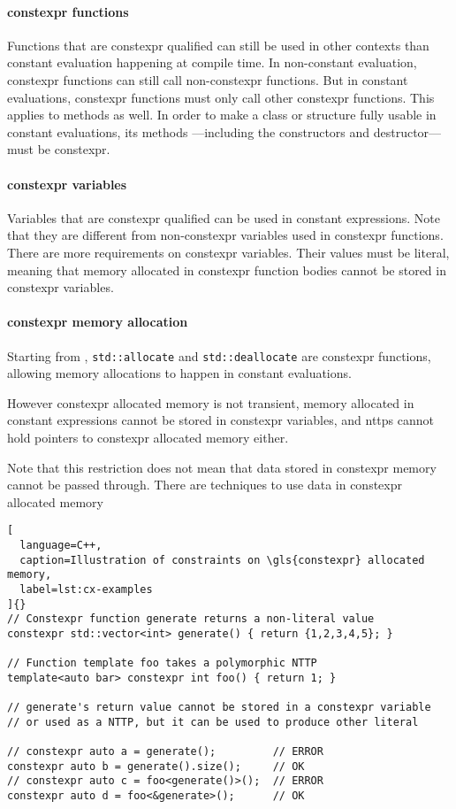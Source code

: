 \documentclass[../main]{subfiles}
\begin{document}
\paragraph{\gls{constexpr} functions} Functions that are \gls{constexpr} qualified can
still be used in other contexts than constant evaluation happening at
compile time. In non-constant evaluation, \gls{constexpr} functions can still call
non-\gls{constexpr} functions. But in constant evaluations, \gls{constexpr} functions must
only call other \gls{constexpr} functions. This applies to methods as well.
In order to make a \cpp class or structure fully usable in constant evaluations,
its methods ---including the constructors and destructor--- must be \gls{constexpr}.

\paragraph{\gls{constexpr} variables} Variables that are \gls{constexpr} qualified can be
used in constant expressions. Note that they are different from
non-\gls{constexpr} variables used in \gls{constexpr} functions.
There are more requirements on \gls{constexpr} variables.
Their values must be literal, meaning that memory allocated in \gls{constexpr}
function bodies cannot be stored in \gls{constexpr} variables.

\paragraph{
  \gls{constexpr} memory allocation
}
Starting from , \lstinline{std::allocate} and \lstinline{std::deallocate}
are \gls{constexpr} functions, allowing memory allocations to happen in
constant evaluations.

However \gls{constexpr} allocated memory is not transient, \ie memory allocated in
constant expressions cannot be stored in \gls{constexpr} variables, and \glspl{nttp}
cannot hold pointers to \gls{constexpr} allocated memory either.

Note that this restriction does not mean that data stored in \gls{constexpr} memory
cannot be passed through. There are techniques to use data in \gls{constexpr}
allocated memory

\begin{lstlisting}[
  language=C++,
  caption=Illustration of constraints on \gls{constexpr} allocated memory,
  label=lst:cx-examples
]{}
// Constexpr function generate returns a non-literal value
constexpr std::vector<int> generate() { return {1,2,3,4,5}; }

// Function template foo takes a polymorphic NTTP
template<auto bar> constexpr int foo() { return 1; }

// generate's return value cannot be stored in a constexpr variable
// or used as a NTTP, but it can be used to produce other literal

// constexpr auto a = generate();         // ERROR
constexpr auto b = generate().size();     // OK
// constexpr auto c = foo<generate()>();  // ERROR
constexpr auto d = foo<&generate>();      // OK
\end{lstlisting}
\end{document}
